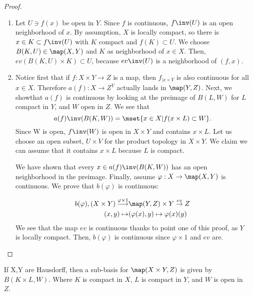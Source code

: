 \documentclass[main.tex]{subfiles}
\begin{document}
\begin{proof}
	
\begin{enumerate}
		\item Let \(U \ni f(x)\) be open in \(Y\). Since \(f\) is continuous, \(f\inv(U)\) is an open neighborhood of \(x\).
		 By assumption, \(X\) is locally compact, so there is \(x \in K \subset f\inv(U)\) with \(K\) compact and \(f(K) \subset U\).
		 We choose \(B(K,U) \in \map(X,Y)\) and \(K\) as neighborhood of \(x \in X\).
		 Then, \(ev(B(K,U) \times K) \subset U\), because \(ev\inv(U)\) is a neighborhood of \((f,x)\).

		\item Notice first that if \(f: X \times Y \to Z\) is a map, then \(f_{|x \times Y}\) is also continuous for all \(x \in X\).
		 Therefore \(a(f): X \to Z^Y \) actually lands in \(\map(Y,Z)\).
		 Next, we showthat \(a(f)\) is continuous by looking at the preimage of \(B(L,W)\) for \(L\) compact in \(Y\), and \(W\) open in \(Z\).
		 We see that
\[
a(f)\inv (B(K,W)) = \mset{x \in X | f(x \times L) \subset W}.
\]
		 Since W is open, \(f\inv(W)\) is open in \(X \times Y\) and contains \(x \times L\).
		 Let us choose an open subset, \(U \times V\) for the product topology in \(X \times Y\).
		 We claim we can assume that it contains \(x \times L\) because \(L\) is compact.

		 We have shown that every \(x \in a(f)\inv (B(K,W))\) has an open neighborhood in the preimage.
		 Finally, assume \(\varphi: X \to \map(X,Y)\) is continuous.
		 We prove that \(b(\varphi)\) is continuous:
		
\begin{align*}
			 b(\varphi), (X \times Y) \stackrel{\varphi \times 1}{\longrightarrow} & \map(Y,Z) \times Y \stackrel{ev}{\to} Z \\
			 (x,y) \mapsto & (\varphi(x), y) \mapsto \varphi(x)(y)
		
\end{align*}
		 We see that the map \(ev\) is continuous thanks to point one of this proof, as \(Y\) is locally compact.
		 Then, \(b(\varphi)\) is continuous since \(\varphi \times 1\) and \(ev\) are.
	
\end{enumerate}
\end{proof}

\begin{lemma}
	If X,Y are Hausdorff, then a sub-basis for \(\map(X \times Y, Z)\) is given by \(B(K \times L, W)\).
	Where \(K\) is compact in \(X\), \(L\) is compact in \(Y\), and \(W\) is open in \(Z\).
\end{lemma}
\end{document}
